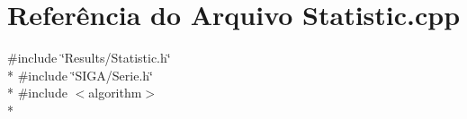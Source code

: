\section{Referência do Arquivo Statistic.\+cpp}
\label{_statistic_8cpp}
{\ttfamily \#include \char`\"{}Results/\+Statistic.\+h\char`\"{}}\\*
{\ttfamily \#include \char`\"{}S\+I\+G\+A/\+Serie.\+h\char`\"{}}\\*
{\ttfamily \#include $<$algorithm$>$}\\*
